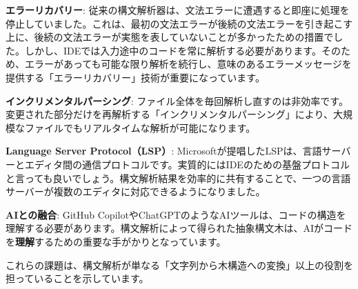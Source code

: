 \textbf{エラーリカバリー}:
従来の構文解析器は、文法エラーに遭遇すると即座に処理を停止していました。これは、最初の文法エラーが後続の文法エラーを引き起こす上に、後続の文法エラーが実態を表していないことが多かったための措置でした。しかし、IDEでは入力途中のコードを常に解析する必要があります。そのため、エラーがあっても可能な限り解析を続行し、意味のあるエラーメッセージを提供する「エラーリカバリー」技術が重要になっています。

\textbf{インクリメンタルパーシング}:
ファイル全体を毎回解析し直すのは非効率です。変更された部分だけを再解析する「インクリメンタルパーシング」により、大規模なファイルでもリアルタイムな解析が可能になります。

\textbf{Language Server Protocol（LSP）}:
Microsoftが提唱したLSPは、言語サーバーとエディタ間の通信プロトコルです。実質的にはIDEのための基盤プロトコルと言っても良いでしょう。構文解析結果を効率的に共有することで、一つの言語サーバーが複数のエディタに対応できるようになりました。

\textbf{AIとの融合}: GitHub
CopilotやChatGPTのようなAIツールは、コードの構造を理解する必要があります。構文解析によって得られた抽象構文木は、AIがコードを\textbf{理解}するための重要な手がかりとなっています。

これらの課題は、構文解析が単なる「文字列から木構造への変換」以上の役割を担っていることを示しています。
